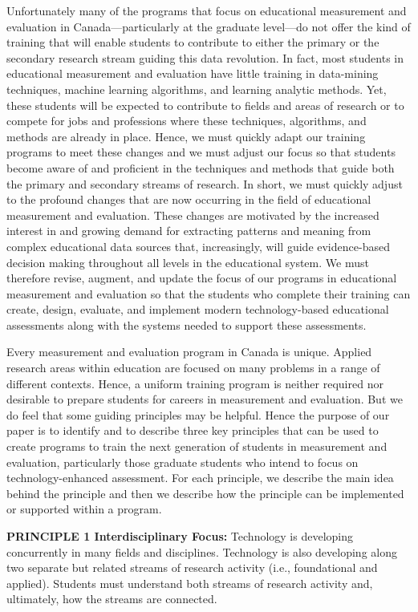\documentclass[
]{book}
\begin{document}
Unfortunately many of the programs that focus on educational measurement and evaluation in Canada---particularly at the graduate level---do not offer the kind of training that will enable students to contribute to either the primary or the secondary research stream guiding this data revolution. In fact, most students in educational measurement and evaluation have little training in data-mining techniques, machine learning algorithms, and learning analytic methods. Yet, these students will be expected to contribute to fields and areas of research or to compete for jobs and professions where these techniques, algorithms, and methods are already in place. Hence, we must quickly adapt our training programs to meet these changes and we must adjust our focus so that students become aware of and proficient in the techniques and methods that guide both the primary and secondary streams of research. In short, we must quickly adjust to the profound changes that are now occurring in the field of educational measurement and evaluation. These changes are motivated by the increased interest in and growing demand for extracting patterns and meaning from complex educational data sources that, increasingly, will guide evidence-based decision making throughout all levels in the educational system. We must therefore revise, augment, and update the focus of our programs in educational measurement and evaluation so that the students who complete their training can create, design, evaluate, and implement modern technology-based educational assessments along with the systems needed to support these assessments.

Every measurement and evaluation program in Canada is unique. Applied research areas within education are focused on many problems in a range of different contexts. Hence, a uniform training program is neither required nor desirable to prepare students for careers in measurement and evaluation. But we do feel that some guiding principles may be helpful. Hence the purpose of our paper is to identify and to describe three key principles that can be used to create programs to train the next generation of students in measurement and evaluation, particularly those graduate students who intend to focus on technology-enhanced assessment. For each principle, we describe the main idea behind the principle and then we describe how the principle can be implemented or supported within a program.

\textbf{PRINCIPLE 1 Interdisciplinary Focus:} Technology is developing concurrently in many fields and disciplines. Technology is also developing along two separate but related streams of research activity (i.e., foundational and applied). Students must understand both streams of research activity and, ultimately, how the streams are connected.
\end{document}
